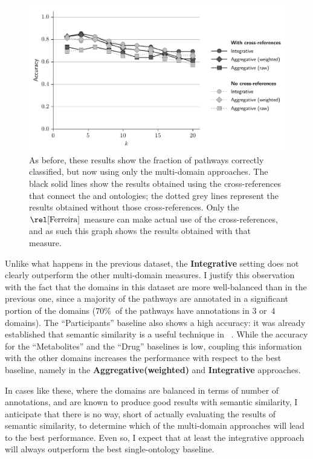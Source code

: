 \begin{figure}
    \centering
    \includegraphics[width=0.9\linewidth]{images/pathways-ferreira-xref-noxref.pdf}
    \caption[Effect of cross-references on the performance of semantic similarity]{As before, these results show the fraction of pathways correctly classified, but now using only the multi-domain approaches. The black solid lines show the results obtained using the cross-references that connect the  and  ontologies; the dotted grey lines represent the results obtained without those cross-references. Only the $\ferreira$ measure can make actual use of the cross-references, and as such this graph shows the results obtained with that measure.}
    \label{fig:xref-pathways}
\end{figure}

Unlike what happens in the previous dataset, the \textbf{Integrative} setting does not clearly outperform the other multi-domain measures. I justify this observation with the fact that the domains in this dataset are more well-balanced than in the previous one, since a majority of the pathways are annotated in a significant portion of the domains ($70\%$~of the pathways have annotations in $3$ or~$4$ domains). The ``Participants'' baseline also shows a high accuracy: it was already established that semantic similarity is a useful technique in ~\citep{Ferreira2010,Ferreira2013}. While the accuracy for the ``Metabolites'' and the ``Drug'' baselines is low, coupling this information with the other domains increases the performance with respect to the best baseline, namely in the \textbf{Aggregative(weighted)} and \textbf{Integrative} approaches.

In cases like these, where the domains are balanced in terms of number of annotations, and are known to produce good results with semantic similarity, I anticipate that there is no way, short of actually evaluating the results of semantic similarity, to determine which of the multi-domain approaches will lead to the best performance. Even so, I expect that at least the integrative approach will always outperform the best single-ontology baseline.

